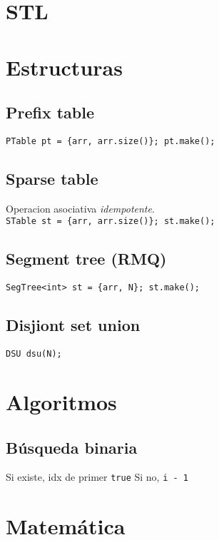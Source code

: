 

\def\title{Notebook (largo)}
\tableofcontents\newpage
 
\section{STL}
    


\section{Estructuras}
    \subsection{Prefix table}
        \texttt{PTable pt = \{arr, arr.size()\}; pt.make();}

    \subsection{Sparse table}
        Operacion asociativa \emph{idempotente}. \\
        \texttt{STable st = \{arr, arr.size()\}; st.make();}

    \subsection{Segment tree (RMQ)}
        \texttt{SegTree<int> st = \{arr, N\}; st.make();}

    \subsection{Disjiont set union}
        \texttt{DSU dsu(N);}


\section{Algoritmos}
    \subsection{Búsqueda binaria}
        Si existe, idx de primer \texttt{true}
        Si no, \texttt{i - 1}


\section{Matemática}
